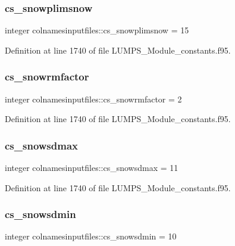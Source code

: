 \subsubsection{\texorpdfstring{cs\+\_\+snowplimsnow}{cs\_snowplimsnow}}
{\footnotesize\ttfamily integer colnamesinputfiles\+::cs\+\_\+snowplimsnow = 15}



Definition at line 1740 of file L\+U\+M\+P\+S\+\_\+\+Module\+\_\+constants.\+f95.

\mbox{\label{namespacecolnamesinputfiles_a40dacb0faac015e28c7aca1d922a2573}} 
\subsubsection{\texorpdfstring{cs\+\_\+snowrmfactor}{cs\_snowrmfactor}}
{\footnotesize\ttfamily integer colnamesinputfiles\+::cs\+\_\+snowrmfactor = 2}



Definition at line 1740 of file L\+U\+M\+P\+S\+\_\+\+Module\+\_\+constants.\+f95.

\mbox{\label{namespacecolnamesinputfiles_a0d7e04ea2aa9c4c1942bec1b07aa8c2b}} 
\subsubsection{\texorpdfstring{cs\+\_\+snowsdmax}{cs\_snowsdmax}}
{\footnotesize\ttfamily integer colnamesinputfiles\+::cs\+\_\+snowsdmax = 11}



Definition at line 1740 of file L\+U\+M\+P\+S\+\_\+\+Module\+\_\+constants.\+f95.

\mbox{\label{namespacecolnamesinputfiles_a527f1adfa8ec04c88f77c6331a0fa3e3}} 
\subsubsection{\texorpdfstring{cs\+\_\+snowsdmin}{cs\_snowsdmin}}
{\footnotesize\ttfamily integer colnamesinputfiles\+::cs\+\_\+snowsdmin = 10}



